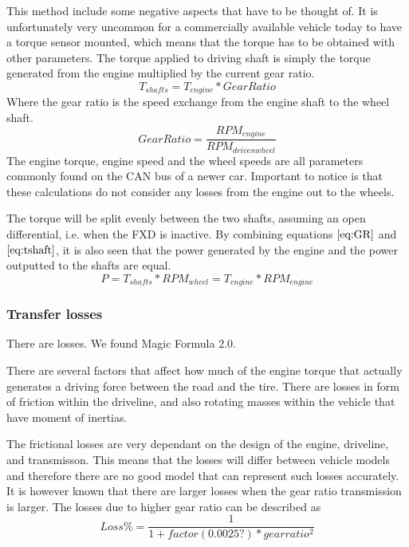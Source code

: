 This method include some negative aspects that have to be thought of. It is unfortunately very uncommon for a commercially available vehicle today to have a torque sensor mounted, which means that the torque has to be obtained with other parameters. The torque applied to driving shaft is simply the torque generated from the engine multiplied by the current gear ratio. 
\begin{equation}
\label{eq:tshaft}
T_{shafts} = T_{engine}*Gear Ratio
\end{equation}
Where the gear ratio is the speed exchange from the engine shaft to the wheel shaft.
\begin{equation}
\label{eq:GR}
Gear Ratio = \frac{RPM_{engine}}{RPM_{drivenwheel}}
\end{equation}
The engine torque, engine speed and the wheel speeds are all parameters commonly found on the CAN bus of a newer car. Important to notice is that these calculations do not consider any losses from the engine out to the wheels.

The torque will be split evenly between the two shafts, assuming an open differential, i.e. when the FXD is inactive. By combining equations $ \ref{eq:GR} $ and $ \ref{eq:tshaft} $, it is also seen that the power generated by the engine and the power outputted to the shafts are equal.
\begin{equation}
	P = T_{shafts}*RPM_{wheel} = T_{engine}*RPM_{engine}
\end{equation}

\subsubsection{Transfer losses}
There are losses. We found Magic Formula 2.0.



There are several factors that affect how much of the engine torque that actually generates a driving force between the road and the tire. There are losses in form of friction within the driveline, and also rotating masses within the vehicle that have moment of inertias. 

The frictional losses are very dependant on the design of the engine, driveline, and transmisson. This means that the losses will differ between vehicle models and therefore there are no good model that can represent such losses accurately. It is however known that there are larger losses when the gear ratio transmission is larger. The losses due to higher gear ratio can be described as
\begin{equation}
	Loss\% = \frac{1}{1 + factor(0.0025?)*gearratio^2}
\end{equation}

